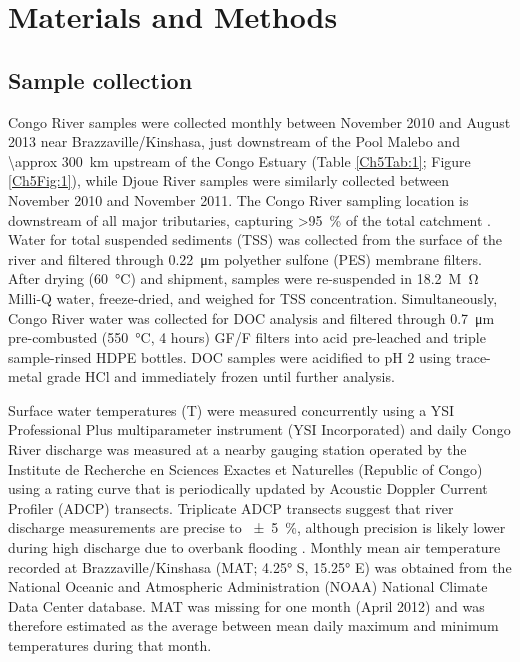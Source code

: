 \section{Materials and Methods}

\subsection{Sample collection}

Congo River samples were collected monthly between November 2010 and August 2013 near Brazzaville/Kinshasa, just downstream of the Pool Malebo and \SI{\approx 300}{km} upstream of the Congo Estuary (Table \ref{Ch5Tab:1}; Figure \ref{Ch5Fig:1}), while Djoue River samples were similarly collected between November 2010 and November 2011. The Congo River sampling location is downstream of all major tributaries, capturing \SI{>95}{\%} of the total catchment \citep{Spencer:2012en}. Water for total suspended sediments (TSS) was collected from the surface of the river and filtered through \SI{0.22}{\micro m} polyether sulfone (PES) membrane filters. After drying (\SI{60}{\celsius}) and shipment, samples were re-suspended in \SI{18.2}{M \ohm} Milli-Q water, freeze-dried, and weighed for TSS concentration. Simultaneously, Congo River water was collected for DOC analysis and filtered through \SI{0.7}{\micro m} pre-combusted (\SI{550}{\celsius}, 4 hours) GF/F filters into acid pre-leached and triple sample-rinsed HDPE bottles. DOC samples were acidified to pH $2$ using trace-metal grade HCl and immediately frozen until further analysis.

Surface water temperatures (T) were measured concurrently using a YSI Professional Plus multiparameter instrument (YSI Incorporated) and daily Congo River discharge was measured at a nearby gauging station operated by the Institute de Recherche en Sciences Exactes et Naturelles (Republic of Congo) using a rating curve that is periodically updated by Acoustic Doppler Current Profiler (ADCP) transects. Triplicate ADCP transects suggest that river discharge measurements are precise to \SI{\pm 5}{\%}, although precision is likely lower during high discharge due to overbank flooding \citep{Spencer:2014vp}. Monthly mean air temperature recorded at Brazzaville/Kinshasa (MAT; \ang{4.25} S, \ang{15.25} E) was obtained from the National Oceanic and Atmospheric Administration (NOAA) National Climate Data Center database. MAT was missing for one month (April 2012) and was therefore estimated as the average between mean daily maximum and minimum temperatures during that month. 

